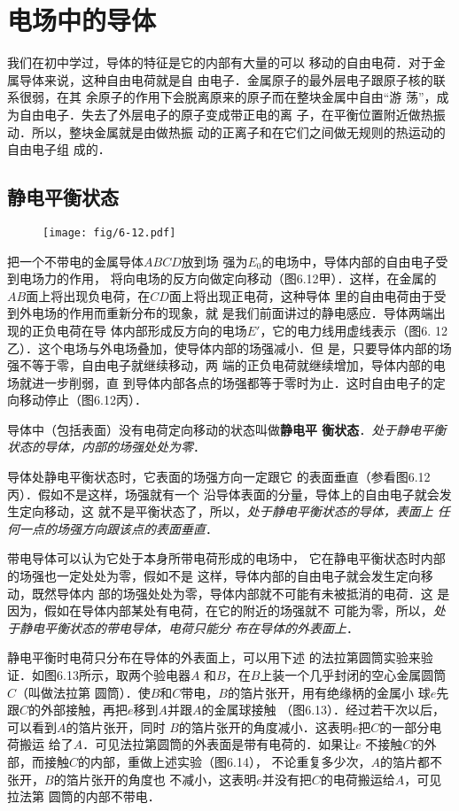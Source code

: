 \section{电场中的导体}
我们在初中学过，导体的特征是它的内部有大量的可以
移动的自由电荷．对于金属导体来说，这种自由电荷就是自
由电子．金属原子的最外层电子跟原子核的联系很弱，在其
余原子的作用下会脱离原来的原子而在整块金属中自由“游
荡”，成为自由电子．失去了外层电子的原子变成带正电的离
子，在平衡位置附近做热振动．所以，整块金属就是由做热振
动的正离子和在它们之间做无规则的热运动的自由电子组
成的．

\subsection{静电平衡状态} 
\begin{figure}[htp]\centering
	\texttt{[image: fig/6-12.pdf]}
	\caption{}
	\end{figure}

把一个不带电的金属导体$ABCD$放到场
强为$E_0$的电场中，导体内部的自由电子受到电场力的作用，
将向电场的反方向做定向移动（图6.12甲）．这样，在金属的
$AB$面上将出现负电荷，在$CD$面上将出现正电荷，这种导体
里的自由电荷由于受到外电场的作用而重新分布的现象，就
是我们前面讲过的静电感应．导体两端出现的正负电荷在导
体内部形成反方向的电场$E'$，它的电力线用虚线表示（图6.
12乙）．这个电场与外电场叠加，使导体内部的场强减小．但
是，只要导体内部的场强不等于零，自由电子就继续移动，两
端的正负电荷就继续增加，导体内部的电场就进一步削弱，直
到导体内部各点的场强都等于零时为止．这时自由电子的定
向移动停止（图6.12丙）．

导体中（包括表面）没有电荷定向移动的状态叫做\textbf{静电平
衡状态}．\textit{处于静电平衡状态的导体，内部的场强处处为零}．

导体处静电平衡状态时，它表面的场强方向一定跟它
的表面垂直（参看图6.12丙）．假如不是这样，场强就有一个
沿导体表面的分量，导体上的自由电子就会发生定向移动，这
就不是平衡状态了，所以，\textit{处于静电平衡状态的导体，表面上
任何一点的场强方向跟该点的表面垂直}．

带电导体可以认为它处于本身所带电荷形成的电场中，
它在静电平衡状态时内部的场强也一定处处为零，假如不是
这样，导体内部的自由电子就会发生定向移动，既然导体内
部的场强处处为零，导体内部就不可能有未被抵消的电荷．这
是因为，假如在导体内部某处有电荷，在它的附近的场强就不
可能为零，所以，\textit{处于静电平衡状态的带电导体，电荷只能分
布在导体的外表面上}．

静电平衡时电荷只分布在导体的外表面上，可以用下述
的法拉第圆筒实验来验证．如图6.13所示，取两个验电器$A$
和$B$，在$B$上装一个几乎封闭的空心金属圆筒$C$（叫做法拉第
圆筒）．使$B$和$C$带电，$B$的箔片张开，用有绝缘柄的金属小
球$e$先跟$C$的外部接触，再把$e$移到$A$并跟$A$的金属球接触
（图6.13）．经过若干次以后，可以看到$A$的箔片张开，同时
$B$的箔片张开的角度减小．这表明$e$把$C$的一部分电荷搬运
给了$A$．可见法拉第圆筒的外表面是带有电荷的．如果让$e$
不接触$C$的外部，而接触$C$的内部，重做上述实验（图6.14），
不论重复多少次，$A$的箔片都不张开，$B$的箔片张开的角度也
不减小，这表明$e$并没有把$C$的电荷搬运给$A$，可见拉法第
圆筒的内部不带电．

